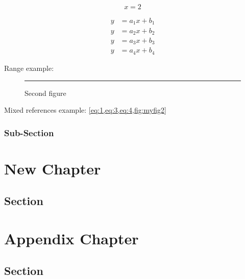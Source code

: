 \documentclass[12pt]{book}
\begin{document}
\begin{equation}
x = 2
\end{equation}

\blindtext
\blindtext
\begin{align}
  y&=a_1x+b_1\label{eq:1}\\
  y&=a_2x+b_2\label{eq:2}\\
  y&=a_3x+b_3\label{eq:3}\\
  y&=a_4x+b_4\label{eq:4}
\end{align}

\noindent
Range example: 
 
\begin{figure}[ht]
  \centering
  \rule{0.5\linewidth}{0.1\linewidth}
  \caption{Second figure}
  \label{fig:myfig2}
\end{figure}
 
\noindent
Mixed references example: \cref{eq:1,eq:3,eq:4,fig:myfig2}

\subsection{Sub-Section}

\chapter{New Chapter}

\section{Section}


\appendix

\chapter{Appendix Chapter}

\section{Section}
\end{document}
